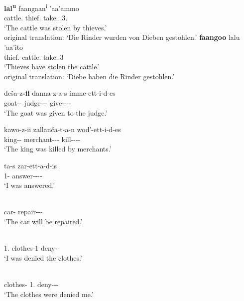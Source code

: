 \begin{exe}\ex\label{KabPass2}
\begin{xlist}
\ex\gll \textbf{lal\textsuperscript{u}} faangaan\textsuperscript{i} 'aa'ammo\\
cattle.\nom{} thief.\loc{} take.\pass{}.\pfv{}.3\sg{}.\mas{}\\
\glt `The cattle was stolen by thieves.'\\
original translation: `Die Rinder wurden von Dieben gestohlen.'
\ex\gll \textbf{faangoo} lalu 'aa'ito\\
thief.\nom{} cattle.\acc{} take.\pfv{}.3\pl{}\\
\glt`Thieves have stolen the cattle.'\\
original translation: `Diebe haben die Rinder gestohlen.'
\end{xlist}
\end{exe}

\begin{exe}\ex\label{GamPass} 
\begin{xlist}
\ex\gll de\v sa-z\textbf{-ii} danna-z-a-s imme-ett-i-d-es\\
goat--\nom{} judge--\gen{}-\Recip{} give-\pass{}-\persm-\tns{}-\complx{}\\
\glt `The goat was given to the judge.' 

\ex\gll kawo-z-ii zall\textglotstop an\v ca-t-a-n wod'-ett-i-d-es\\
king--\nom{} merchant-\pl{}-\acc{}-\loc{} kill-\pass{}-\persm-\tns{}-\complx{} \\
\glt`The king was killed by merchants.' %

\ex \gll ta-s zar-ett-a-d-is\\
1\sg{}-\Recip{} answer-\pass{}-\persm-\tns{}-\complx{}\\
\glt`I was answered.'
\end{xlist}
\end{exe}

\begin{exe}\ex\label{HarPass}
\begin{xlist}
\ex\gll{}  \\
car-\nom{} \foc{} repair-\pass{}-\fem{}-\ipfv{}\\
\glt `The car will be repaired.'  

\ex\gll{}  \\
1\sg{}.\nom{} clothes-1\sg{} deny-\pass{}-\pst{}\\
\glt `I was denied the clothes.'

\ex\gll{}  \\
clothes-\nom{} 1\sg{}.\acc{} deny-\pass{}-\fem{}-\pst{}\\
\glt `The clothes were denied me.' 
\end{xlist} 
\end{exe}

